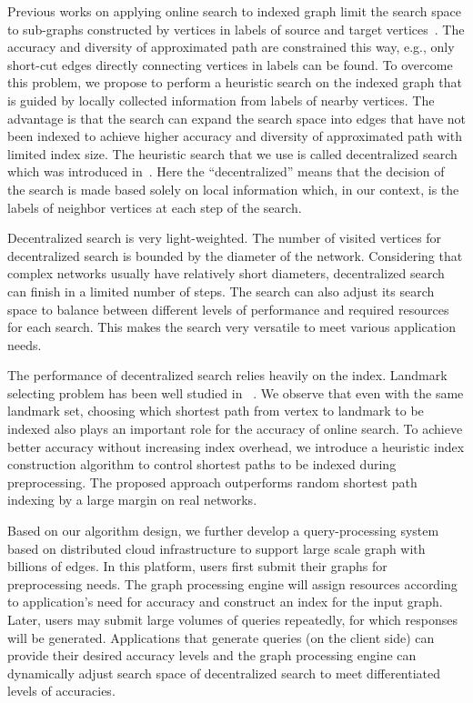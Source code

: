 Previous works on applying online search to indexed graph limit the search space to sub-graphs constructed by vertices in labels of source and target vertices~\cite{Gubichev:2010:FAE:1871437.1871503, 6399472}. The accuracy and diversity of approximated path are constrained this way, e.g., only short-cut edges directly connecting vertices in labels can be found. To overcome this problem, we propose to perform a heuristic search on the indexed graph that is guided by locally collected information from labels of nearby vertices. The advantage is that the search can expand the search space into edges that have not been indexed to achieve higher accuracy and diversity of approximated path with limited index size. The heuristic search that we use is called decentralized search which was introduced in~\cite{Kleinberg:2000p5066, kleinberg2006complex}. Here the ``decentralized'' means that the decision of the search is made based solely on local information which, in our context, is the labels of neighbor vertices at each step of the search.

Decentralized search is very light-weighted. The number of visited vertices for decentralized search is bounded by the diameter of the network. Considering that complex networks usually have relatively short diameters, decentralized search can finish in a limited number of steps. The search can also adjust its search space to balance between different levels of performance and required resources for each search. This makes the search very versatile to meet various application needs.  

The performance of decentralized search relies heavily on the index. Landmark selecting problem has been well studied in ~\cite{Potamias:2009:FSP:1645953.1646063,6927522}. We observe that even with the same landmark set, choosing which shortest path from vertex to landmark to be indexed also plays an important role for the accuracy of online search. To achieve better accuracy without increasing index overhead, we introduce a heuristic index construction algorithm to control shortest paths to be indexed during preprocessing. The proposed approach outperforms random shortest path indexing by a large margin on real networks.

Based on our algorithm design, we further develop a query-processing system based on distributed cloud infrastructure to support large scale graph with billions of edges. In this platform, users first submit their graphs for preprocessing needs. The graph processing engine will assign resources according to application's need for accuracy and construct an index for the input graph. Later, users may submit large volumes of queries repeatedly, for which responses will be generated. Applications that generate queries (on the client side) can provide their desired accuracy levels and the graph processing engine can dynamically adjust search space of decentralized search to meet differentiated levels of accuracies.

